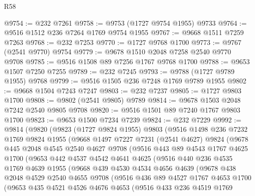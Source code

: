 \begin{lexlean}{R58}
\begin{coremodule}
@9754 := @232 @7261
@9758 := @9753 (@1727 @9754 @1955) @9733
@9764 := @9516 @1512 @236 @7264 @1769 @9754 @1955
@9767 := @9668 @1511 @7259 @7263
@9768 := @232 @7253
@9770 := @1727 @9768 @1700
@9773 := @9767 (@2541 @9770) @9754
@9779 := @9678 @1510 @2048 @7258 @2540 @9770 @9708
@9785 := @9516 @1508 @89 @7256 @1767 @9768 @1700
@9788 := @9653 @1507 @7250 @7255
@9789 := @232 @7245
@9793 := @9788 (@1727 @9789 @1955) @9768
@9799 := @9516 @1505 @236 @7248 @1769 @9789 @1955
@9802 := @9668 @1504 @7243 @7247
@9803 := @232 @7237
@9805 := @1727 @9803 @1700
@9808 := @9802 (@2541 @9805) @9789
@9814 := @9678 @1503 @2048 @7242 @2540 @9805 @9708
@9820 := @9516 @1501 @89 @7240 @1767 @9803 @1700
@9823 := @9653 @1500 @7234 @7239
@9824 := @232 @7229
@9992 := @9814
    (@9820
      (@9823
        (@1727 @9824 @1955)
        @9803
        (@9516
          @1498
          @236
          @7232
          @1769
          @9824
          @1955
          (@9668
            @1497
            @7227
            @7231
            (@2541 @4627)
            @9824
            (@9678
              @445
              @2048
              @4545
              @2540
              @4627
              @9708
              (@9516
                @443
                @89
                @4543
                @1767
                @4625
                @1700
                (@9653
                  @442
                  @4537
                  @4542
                  @4641
                  @4625
                  (@9516
                    @440
                    @236
                    @4535
                    @1769
                    @4639
                    @1955
                    (@9668
                      @439
                      @4530
                      @4534
                      @4656
                      @4639
                      (@9678
                        @438
                        @2048
                        @4529
                        @2540
                        @4655
                        @9708
                        (@9516
                          @436
                          @89
                          @4527
                          @1767
                          @4653
                          @1700
                          (@9653
                            @435
                            @4521
                            @4526
                            @4676
                            @4653
                            (@9516
                              @433
                              @236
                              @4519
                              @1769

\end{coremodule}
\end{lexlean}
